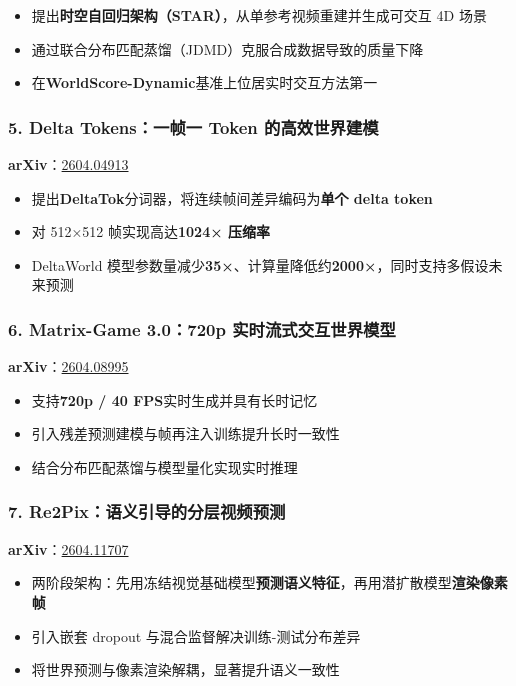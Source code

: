 \begin{itemize}[leftmargin=1.5em]
  \item 提出\textbf{时空自回归架构（STAR）}，从单参考视频重建并生成可交互 4D 场景
  \item 通过联合分布匹配蒸馏（JDMD）克服合成数据导致的质量下降
  \item 在\textbf{WorldScore-Dynamic}基准上位居实时交互方法第一
\end{itemize}

\subsubsection{5. Delta Tokens：一帧一 Token 的高效世界建模}

\textbf{arXiv}：\href{https://arxiv.org/abs/2604.04913}{2604.04913}

\begin{itemize}[leftmargin=1.5em]
  \item 提出\textbf{DeltaTok}分词器，将连续帧间差异编码为\textbf{单个 delta token}
  \item 对 512×512 帧实现高达\textbf{1024× 压缩率}
  \item DeltaWorld 模型参数量减少\textbf{35×}、计算量降低约\textbf{2000×}，同时支持多假设未来预测
\end{itemize}

\subsubsection{6. Matrix-Game 3.0：720p 实时流式交互世界模型}

\textbf{arXiv}：\href{https://arxiv.org/abs/2604.08995}{2604.08995}

\begin{itemize}[leftmargin=1.5em]
  \item 支持\textbf{720p / 40 FPS}实时生成并具有长时记忆
  \item 引入残差预测建模与帧再注入训练提升长时一致性
  \item 结合分布匹配蒸馏与模型量化实现实时推理
\end{itemize}

\subsubsection{7. Re2Pix：语义引导的分层视频预测}

\textbf{arXiv}：\href{https://arxiv.org/abs/2604.11707}{2604.11707}

\begin{itemize}[leftmargin=1.5em]
  \item 两阶段架构：先用冻结视觉基础模型\textbf{预测语义特征}，再用潜扩散模型\textbf{渲染像素帧}
  \item 引入嵌套 dropout 与混合监督解决训练-测试分布差异
  \item 将世界预测与像素渲染解耦，显著提升语义一致性
\end{itemize}


